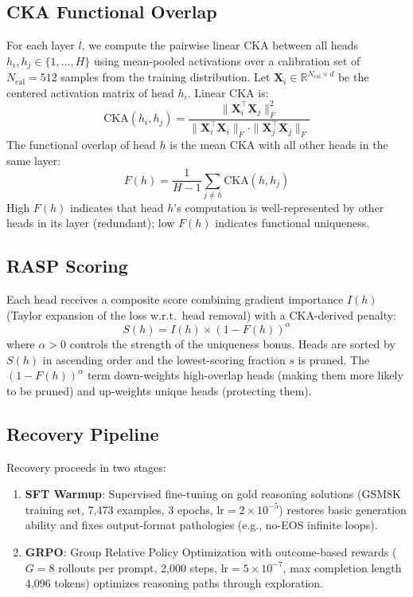 \documentclass[11pt]{article}
\begin{document}
\subsection{CKA Functional Overlap}
For each layer $l$, we compute the pairwise linear CKA between all heads $h_i, h_j \in \{1, \ldots, H\}$ using mean-pooled activations over a calibration set of $N_{\text{cal}} = 512$ samples from the training distribution.
Let $\mathbf{X}_i \in \mathbb{R}^{N_{\text{cal}} \times d}$ be the centered activation matrix of head $h_i$.
Linear CKA is:
\begin{equation}
\text{CKA}(h_i, h_j) = \frac{\|\mathbf{X}_i^\top \mathbf{X}_j\|_F^2}{\|\mathbf{X}_i^\top \mathbf{X}_i\|_F \cdot \|\mathbf{X}_j^\top \mathbf{X}_j\|_F}
\end{equation}
The functional overlap of head $h$ is the mean CKA with all other heads in the same layer:
\begin{equation}
F(h) = \frac{1}{H-1}\sum_{j \neq h} \text{CKA}(h, h_j)
\end{equation}
High $F(h)$ indicates that head $h$'s computation is well-represented by other heads in its layer (redundant); low $F(h)$ indicates functional uniqueness.

\subsection{RASP Scoring}
Each head receives a composite score combining gradient importance $I(h)$ (Taylor expansion of the loss w.r.t.\ head removal) with a CKA-derived penalty:
\begin{equation}
S(h) = I(h) \times (1 - F(h))^\alpha
\end{equation}
where $\alpha > 0$ controls the strength of the uniqueness bonus.
Heads are sorted by $S(h)$ in ascending order and the lowest-scoring fraction $s$ is pruned.
The $(1 - F(h))^\alpha$ term down-weights high-overlap heads (making them more likely to be pruned) and up-weights unique heads (protecting them).

\subsection{Recovery Pipeline}
\label{sec:recovery_pipeline}
Recovery proceeds in two stages:
\begin{enumerate}
\item \textbf{SFT Warmup}: Supervised fine-tuning on gold reasoning solutions (GSM8K training set, 7{,}473 examples, 3 epochs, $\text{lr} = 2 \times 10^{-5}$) restores basic generation ability and fixes output-format pathologies (e.g., no-EOS infinite loops).
\item \textbf{GRPO}: Group Relative Policy Optimization \citep{deepseek2025r1} with outcome-based rewards ($G = 8$ rollouts per prompt, 2{,}000 steps, $\text{lr} = 5 \times 10^{-7}$, max completion length 4{,}096 tokens) optimizes reasoning paths through exploration.
\end{enumerate}
\end{document}
